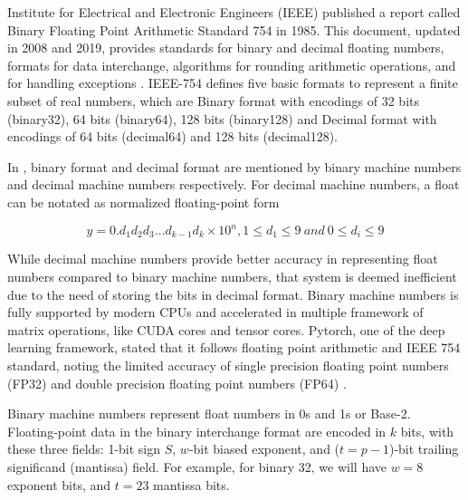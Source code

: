 \documentclass[ %
                    author={Revalda Putawara},
                supervisor={Dr. James Pope},
                    degree={MSc},
                     title={Robustness of Bayesian Neural Networks Design Choices Against Weight and Bias Perturbation Induced by Single Event Upsets (SEUs)},
                      type={},
                      year={2025}]{dissertation}
\begin{document}

\iffalse
Institute for Electrical and Electronic Engineers (IEEE) published a report called Binary Floating Point Arithmetic Standard 754 in 1985. This document, updated in 2008 and 2019, provides standards for binary and decimal floating numbers, formats for data interchange, algorithms for rounding arithmetic operations, and for handling exceptions \cite{BurdenFaires2010}. IEEE-754 \cite{IEEE754-2019} defines five basic formats to represent a finite subset of real numbers, which are Binary format with encodings of 32 bits (binary32), 64 bits (binary64), 128 bits (binary128) and Decimal format with encodings of 64 bits (decimal64) and 128 bits (decimal128).

In \cite{BurdenFaires2010}, binary format and decimal format are mentioned by binary machine numbers and decimal machine numbers respectively. For decimal machine numbers, a float can be notated as normalized floating-point form

$$
y = 0.d_1d_2d_3{\dots}d_{k-1}d_{k} \times 10^{n} , 1 \le d_1 \le 9 \ and \ 0 \le d_i \le 9
$$

While decimal machine numbers provide better accuracy in representing float numbers compared to binary machine numbers, that system is deemed inefficient due to the need of storing the bits in decimal format. Binary machine numbers is fully supported by modern CPUs and accelerated in multiple framework of matrix operations, like CUDA cores and tensor cores. Pytorch, one of the deep learning framework, stated that it follows floating point arithmetic and IEEE 754 standard, noting the limited accuracy of single precision floating point numbers (FP32) and double precision floating point numbers (FP64) \cite{pytorchNumericalAccuracy}. 

Binary machine numbers represent float numbers in 0s and 1s or Base-2. Floating-point data in the binary interchange format are encoded in $k$ bits, with these three fields: 1-bit sign $S$, $w$-bit biased exponent, and ($t=p-1$)-bit trailing significand (mantissa) field. For example, for binary 32, we will have $w=8$ exponent bits, and $t=23$ mantissa bits.
\end{document}
